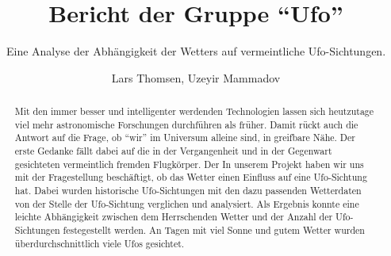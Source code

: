\title{Bericht der Gruppe \enquote{Ufo}}
\subtitle{Eine Analyse der Abhängigkeit der Wetters auf vermeintliche Ufo-Sichtungen.}         %


\author{Lars Thomsen, Uzeyir Mammadov}

\begin{abstract}
    Mit den immer besser und intelligenter werdenden Technologien lassen sich heutzutage viel mehr astronomische Forschungen durchführen als früher. Damit rückt auch die Antwort auf die Frage, ob \enquote{wir} im Universum alleine sind, in greifbare Nähe. Der erste Gedanke fällt dabei auf die in der Vergangenheit und in der Gegenwart gesichteten vermeintlich fremden Flugkörper. Der In unserem Projekt haben wir uns mit der Fragestellung beschäftigt, ob das Wetter einen Einfluss auf eine Ufo-Sichtung hat. Dabei wurden historische Ufo-Sichtungen mit den dazu passenden Wetterdaten von der Stelle der Ufo-Sichtung verglichen und analysiert. Als Ergebnis konnte eine leichte Abhängigkeit zwischen dem Herrschenden Wetter und der Anzahl der Ufo-Sichtungen festegestellt werden. An Tagen mit viel Sonne und gutem Wetter wurden überdurchschnittlich viele Ufos gesichtet.

\end{abstract}

\maketitle
